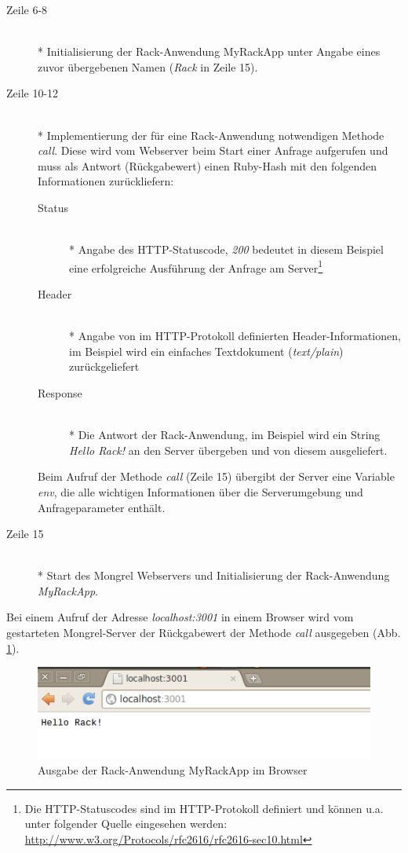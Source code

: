 

\begin{description}
\item[Zeile 6-8]\mbox{~}\\*
Initialisierung der Rack-Anwendung MyRackApp unter Angabe eines zuvor übergebenen Namen (\emph{Rack} in Zeile 15).
\item[Zeile 10-12]\mbox{~}\\*
Implementierung der für eine Rack-Anwendung notwendigen Methode \emph{call}. Diese wird vom Webserver beim Start einer Anfrage aufgerufen und muss als Antwort (Rückgabewert) einen Ruby-Hash mit den folgenden Informationen zurückliefern:
\begin{description}
\item[Status]\mbox{~}\\*
Angabe des HTTP-Statuscode, \emph{200} bedeutet in diesem Beispiel eine erfolgreiche Ausführung der Anfrage am Server\footnote{Die HTTP-Statuscodes sind im HTTP-Protokoll definiert und können u.a. unter folgender Quelle eingesehen werden: \href{http://www.w3.org/Protocols/rfc2616/rfc2616-sec10.html}{http://www.w3.org/Protocols/rfc2616/rfc2616-sec10.html}}
\item[Header]\mbox{~}\\*
Angabe von im HTTP-Protokoll definierten Header-Informationen,  im Beispiel wird ein einfaches Textdokument (\emph{text/plain}) zurückgeliefert
\item[Response]\mbox{~}\\*
Die Antwort der Rack-Anwendung, im Beispiel wird ein String \emph{Hello Rack!} an den Server übergeben und von diesem ausgeliefert.
\end{description}

Beim Aufruf der Methode \emph{call} (Zeile 15) übergibt der Server eine Variable \emph{env}, die alle wichtigen Informationen über die Serverumgebung und Anfrageparameter enthält.
\item[Zeile 15]\mbox{~}\\*
Start des Mongrel Webservers und Initialisierung der Rack-Anwendung \emph{MyRackApp}.
\end{description}

Bei einem Aufruf der Adresse \emph{localhost:3001} in einem Browser wird vom gestarteten Mongrel-Server der Rückgabewert der Methode \emph{call} ausgegeben (Abb. \ref{rackoutput}).

\begin{figure}[!ht]
\begin{center}
\includegraphics[scale=0.6]{images/rack/outputrack2.png}
\caption{Ausgabe der Rack-Anwendung MyRackApp im Browser}
\label{rackoutput}
\end{center}
\end{figure}

